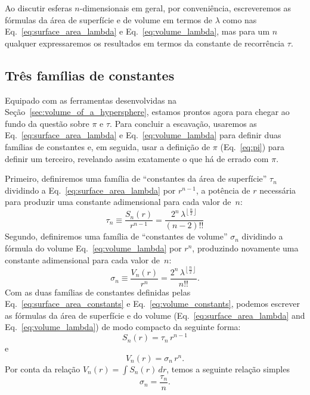 Ao discutir esferas $n$-dimensionais em geral, por conveniência, \linebreak escreveremos as fórmulas da área de superfície e de volume em termos de $\lambda$ como nas Eq.~\eqref{eq:surface_area_lambda} e Eq.~\eqref{eq:volume_lambda}, mas para um $n$ qualquer expressaremos os resultados em termos da constante de recorrência $\tau$.




  \subsection{Três famílias de constantes} %
  \label{sec:three_families_of_constants}

Equipado com as ferramentas desenvolvidas na Seção~\ref{sec:volume_of_a_hypersphere}, estamos prontos agora para chegar ao fundo da questão sobre $\pi$ e $\tau$. Para concluir a escavação, usaremos as Eq.~\eqref{eq:surface_area_lambda} e Eq.~\eqref{eq:volume_lambda} para definir duas famílias de constantes e, em seguida, usar a definição de $\pi$ (Eq.~\eqref{eq:pi}) para definir um terceiro, revelando assim exatamente o que há de errado com $\pi$.

Primeiro, definiremos uma família de ``constantes da área de superfície'' $\tau_n$ dividindo \linebreak a Eq.~\eqref{eq:surface_area_lambda} por $r^{n-1}$, a potência de $r$ necessária para produzir uma constante adimensional para cada valor de~$n$:
\begin{equation}
\label{eq:surface_area_constants}
\tau_n \equiv \frac{S_n(r)}{r^{n-1}} = \frac{2^n\,\lambda^{\left\lfloor \frac{n}{2} \right\rfloor}}{(n-2)!!}
\end{equation}
Segundo, definiremos uma família de ``constantes de volume'' $\sigma_n$ dividindo a fórmula do volume Eq.~\eqref{eq:volume_lambda} por $r^n$, produzindo novamente uma constante adimensional para cada valor de~$n$:
\begin{equation}
\label{eq:volume_constants}
\sigma_n \equiv \frac{V_n(r)}{r^n} = \frac{2^n\,\lambda^{\left\lfloor \frac{n}{2} \right\rfloor}}{n!!}.
\end{equation}
Com as duas famílias de constantes definidas pelas Eq.~\eqref{eq:surface_area_constants} e Eq.~\eqref{eq:volume_constants}, podemos escrever as fórmulas da área de superfície e do volume (Eq.~\eqref{eq:surface_area_lambda} and Eq.~\eqref{eq:volume_lambda}) de modo compacto da seguinte forma:
\[ S_n(r) = \tau_n\,r^{n-1} \]
e
\[ V_n(r) = \sigma_n\,r^n. \]
Por conta da relação $V_n(r) = \int S_n(r)\,dr$, temos a seguinte relação simples
\[
\sigma_n = \frac{\tau_n}{n}.
\]

